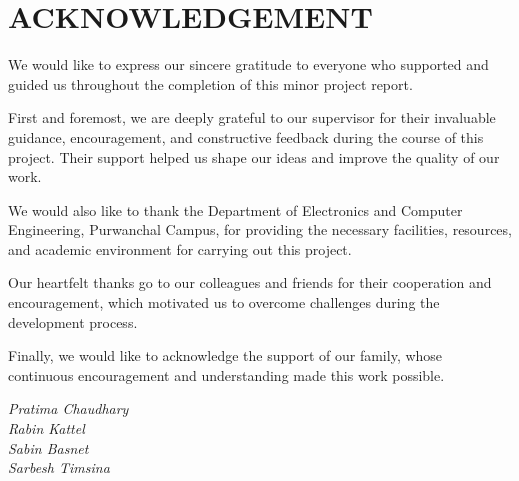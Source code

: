 \chapter*{ACKNOWLEDGEMENT}


We would like to express our sincere gratitude to everyone who supported and guided us throughout the completion of this minor project report.

First and foremost, we are deeply grateful to our supervisor for their invaluable guidance, encouragement, and constructive feedback during the course of this project. Their support helped us shape our ideas and improve the quality of our work.

We would also like to thank the Department of Electronics and Computer Engineering, Purwanchal Campus, for providing the necessary facilities, resources, and academic environment for carrying out this project.

Our heartfelt thanks go to our colleagues and friends for their cooperation and encouragement, which motivated us to overcome challenges during the development process.

Finally, we would like to acknowledge the support of our family, whose continuous encouragement and understanding made this work possible.

\vspace{1.5cm}

\textit{Pratima Chaudhary}\\
\textit{Rabin Kattel}\\
\textit{Sabin Basnet}\\
\textit{Sarbesh Timsina}

\clearpage
